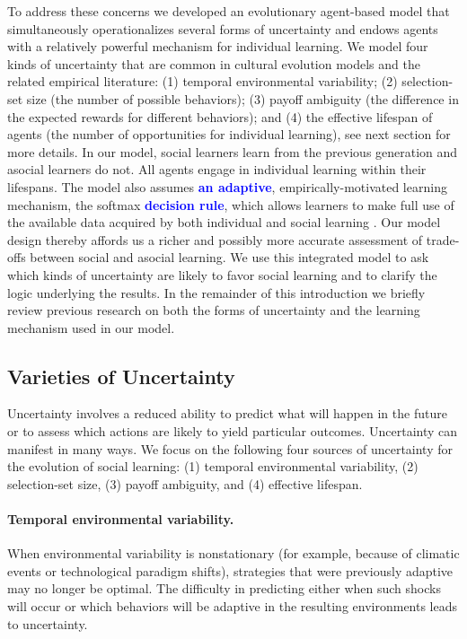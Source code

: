 \documentclass[letterpaper,11.5pt]{scrartcl}
\newcommand{\edit}[1]{{\bfseries \textcolor{blue} {#1}}}
\begin{document}
To address these concerns we developed an evolutionary agent-based model that
simultaneously operationalizes several forms of uncertainty and endows agents
with a relatively powerful mechanism for individual learning. We model four kinds of
uncertainty that are common in cultural evolution models and the related empirical
literature:  (1) temporal environmental variability; (2) selection-set size (the number of possible behaviors); (3) payoff ambiguity
(the difference in the expected rewards for different behaviors); and (4) the effective lifespan of agents (the number of
opportunities for individual learning), see next section for more details. In our model, social learners learn from the previous
generation and asocial learners do not. All agents engage in individual learning
within their lifespans. The model also assumes \edit{an adaptive},
empirically-motivated learning mechanism, the softmax \edit{decision rule}, which allows learners to make full use of the available data acquired by both individual and social learning \citep{SuttonBartoBook}. Our model design thereby affords us a richer and possibly more accurate assessment of trade-offs between social and asocial learning. We use this integrated model to ask which kinds of uncertainty are likely to favor social learning and to clarify the logic underlying the results.
In the remainder of this introduction we briefly review previous research on both the forms of uncertainty and the learning mechanism used in our model. 


\subsection{Varieties of Uncertainty}

Uncertainty involves a reduced ability to predict what will happen in the future or to assess which actions are likely to yield particular outcomes. Uncertainty can manifest in many ways. We focus on the following four sources of uncertainty for the evolution of social learning: (1) temporal environmental variability, (2) selection-set size, (3) payoff ambiguity, and (4) effective lifespan.

\paragraph{Temporal environmental variability.} When environmental variability is nonstationary (for example, because of climatic events %
or technological paradigm shifts), strategies that were previously adaptive may no longer be optimal. The difficulty in predicting either when such shocks will occur or which behaviors will be adaptive in the resulting environments leads to uncertainty. 
\end{document}
